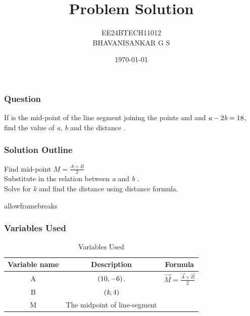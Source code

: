 \documentclass{beamer}
\begin{document}
\title{Problem Solution}
\author{EE24BTECH11012 \\ BHAVANISANKAR G S }
\date{\today}
\frame{\titlepage}

\begin{frame}
\frametitle{Question}
If  is the mid-point of the line segment joining the points   and   and $ \emph{a} - 2\emph{b} = 18 $, find the value of \emph{a}, \emph{b} and the distance  .
\end{frame}

\begin{frame}
\frametitle{Solution Outline}
Find mid-point $M = \frac{A+B}{2}$ \\
Substitute in the relation between \emph{a} and \emph{b} . \\
Solve for \emph{k} and find the distance using distance formula. \\
\end{frame}

\begin{frame}{allowframebreaks}
\frametitle{Variables Used}
\begin{table}[H]
	\centering
	\begin{tabular}{|c|c|c|}
    \hline
    \textbf{Variable name} & \textbf{Description} & \textbf{Formula}\\ 
    \hline
    A & $\left(10,-6\right)$. &  $\vec{M} = \frac{\vec{A} + \vec{B}}{2}$\\
    \hline 
		B & $\left(\emph{k},4\right)$ &  \\
    \hline
		M & The midpoint of line-segment \vec{AB} &   \\
    \hline   
    \end{tabular}
	\vspace{2mm}
	\caption{Variables Used}
	\label{table_1.8.23}
\end{table}
\end{frame}
\end{document}
